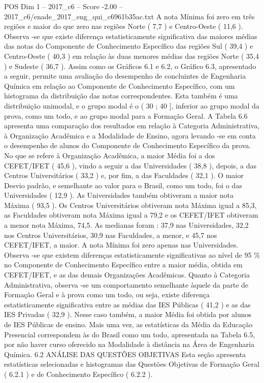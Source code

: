 \begin{textsample}{POS Dim 1 – 2017\_c6 – Score -2.00 – 2017\_c6/enade\_2017\_eng\_qui\_c6961b35ac.txt}
A nota Mínima foi zero em três regiões e maior do que zero nas regiões Norte ( 7,7 ) e Centro-Oeste ( 11,6 ).
Observa -se que existe diferença estatisticamente significativa das maiores médias das notas do Componente de Conhecimento Específico das regiões Sul ( 39,4 ) e Centro-Oeste ( 40,3 ) em relação às duas menores médias das regiões Norte ( 35,4 ) e Sudeste ( 36,7 ).
Assim como os Gráficos 6.1 e 6.2, o Gráfico 6.3, apresentado a seguir, permite uma avaliação do desempenho de concluintes de Engenharia Química em relação ao Componente de Conhecimento Específico, com um histograma da distribuição das notas correspondentes.
Esta também é uma distribuição unimodal, e o grupo modal é o ( 30 ; 40 ], inferior ao grupo modal da prova, como um todo, e ao grupo modal para a Formação Geral.
A Tabela 6.6 apresenta uma comparação dos resultados em relação à Categoria Administrativa, à Organização Acadêmica e a Modalidade de Ensino, agora levando -se em conta o desempenho de alunos do Componente de Conhecimento Específico da prova.
No que se refere à Organização Acadêmica, a maior Média foi a dos CEFET/IFET ( 45,6 ), vindo a seguir a das Universidades ( 38,8 ), depois, a das Centros Universitários ( 33,2 ) e, por fim, a das Faculdades ( 32,1 ).
O maior Desvio padrão, e semelhante ao valor para o Brasil, como um todo, foi o das Universidades ( 12,9 ).
As Universidades também obtiveram a maior nota Máxima ( 93,5 ).
Os Centros Universitários obtiveram nota Máxima igual a 85,3, as Faculdades obtiveram nota Máxima igual a 79,2 e os CEFET/IFET obtiveram a menor nota Máxima, 74,5.
As medianas foram : 37,9 nas Universidades, 32,2 nos Centros Universitários, 30,9 nas Faculdades, a menor, e 45,7 nos CEFET/IFET, a maior.
A nota Mínima foi zero apenas nas Universidades.
Observa -se que existem diferenças estatisticamente significativas ao nível de 95 \% no Componente de Conhecimento Específico entre a maior média, obtida em CEFET/IFET, e as das demais Organizações Acadêmicas.
Quanto à Categoria Administrativa, observa -se um comportamento semelhante àquele da parte de Formação Geral e à prova como um todo, ou seja, existe diferença estatisticamente significativa entre as médias das IES Públicas ( 41,2 ) e as das IES Privadas ( 32,9 ).
Nesse caso também, a maior Média foi obtida por alunos de IES Públicas de ensino.
Mais uma vez, as estatísticas da Média da Educação Presencial correspondem às do Brasil como um todo, apresentada na Tabela 6.5, por não haver curso oferecido na Modalidade à distância na Área de Engenharia Química. 6.2 ANÁLISE DAS QUESTÕES OBJETIVAS Esta seção apresenta estatísticas selecionadas e histogramas das Questões Objetivas de Formação Geral ( 6.2.1 ) e de Conhecimento Específico ( 6.2.2 ).

\end{textsample}
